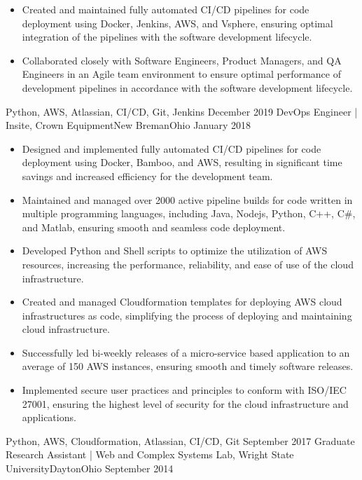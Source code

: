 \begin{experiences}
{\begin{itemize}
          \item Created and maintained fully automated CI/CD pipelines for code deployment using Docker, Jenkins, AWS, and Vsphere, ensuring optimal integration of the pipelines with the software development lifecycle.
          \item Collaborated closely with Software Engineers, Product Managers, and QA Engineers in an Agile team environment to ensure optimal performance of development pipelines in accordance with the software development lifecycle.
      \end{itemize}
  }
  {Python, AWS, Atlassian, CI/CD, Git, Jenkins}
  \emptySeparator
  \experience
    {December 2019}   {DevOps Engineer | Insite, Crown Equipment}{New Breman}{Ohio}
    {January 2018} {
      \begin{itemize}
          \item Designed and implemented fully automated CI/CD pipelines for code deployment using Docker, Bamboo, and AWS, resulting in significant time savings and increased efficiency for the development team.
          \item Maintained and managed over 2000 active pipeline builds for code written in multiple programming languages, including Java, Nodejs, Python, C++, C\#, and Matlab, ensuring smooth and seamless code deployment.
          \item Developed Python and Shell scripts to optimize the utilization of AWS resources, increasing the performance, reliability, and ease of use of the cloud infrastructure.
          \item Created and managed Cloudformation templates for deploying AWS cloud infrastructures as code, simplifying the process of deploying and maintaining cloud infrastructure.
          \item Successfully led bi-weekly releases of a micro-service based application to an average of 150 AWS instances, ensuring smooth and timely software releases.
          \item Implemented secure user practices and principles to conform with ISO/IEC 27001, ensuring the highest level of security for the cloud infrastructure and applications.
      \end{itemize}
  }
  {Python, AWS, Cloudformation, Atlassian, CI/CD, Git}
  \emptySeparator
  \experience
    {September 2017}   { Graduate Research Assistant | Web and Complex Systems Lab, Wright State University}{Dayton}{Ohio}
    {September 2014} {
      \begin{itemize}

\end{itemize}}
\end{experiences}
